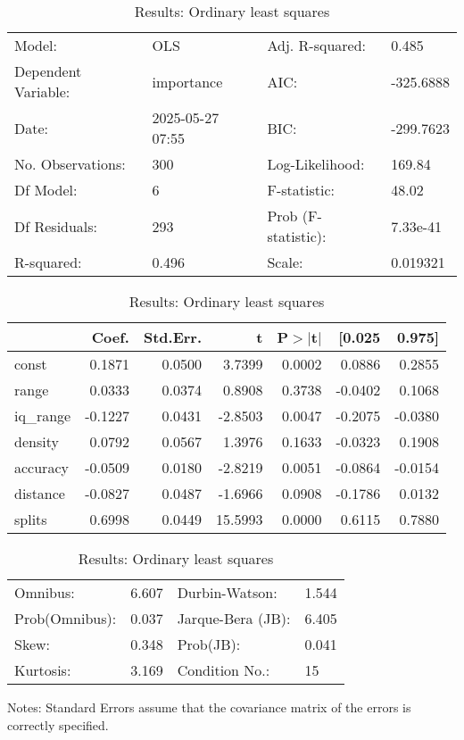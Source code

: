 \begin{table}
\caption{Results: Ordinary least squares}
\label{}
\begin{center}
\begin{tabular}{llll}
\hline
Model:              & OLS              & Adj. R-squared:     & 0.485      \\
Dependent Variable: & importance       & AIC:                & -325.6888  \\
Date:               & 2025-05-27 07:55 & BIC:                & -299.7623  \\
No. Observations:   & 300              & Log-Likelihood:     & 169.84     \\
Df Model:           & 6                & F-statistic:        & 48.02      \\
Df Residuals:       & 293              & Prob (F-statistic): & 7.33e-41   \\
R-squared:          & 0.496            & Scale:              & 0.019321   \\
\hline
\end{tabular}
\end{center}

\begin{center}
\begin{tabular}{lrrrrrr}
\hline
          &   Coef. & Std.Err. &       t & P$> |$t$|$ &  [0.025 &  0.975]  \\
\hline
const     &  0.1871 &   0.0500 &  3.7399 &      0.0002 &  0.0886 &  0.2855  \\
range     &  0.0333 &   0.0374 &  0.8908 &      0.3738 & -0.0402 &  0.1068  \\
iq\_range & -0.1227 &   0.0431 & -2.8503 &      0.0047 & -0.2075 & -0.0380  \\
density   &  0.0792 &   0.0567 &  1.3976 &      0.1633 & -0.0323 &  0.1908  \\
accuracy  & -0.0509 &   0.0180 & -2.8219 &      0.0051 & -0.0864 & -0.0154  \\
distance  & -0.0827 &   0.0487 & -1.6966 &      0.0908 & -0.1786 &  0.0132  \\
splits    &  0.6998 &   0.0449 & 15.5993 &      0.0000 &  0.6115 &  0.7880  \\
\hline
\end{tabular}
\end{center}

\begin{center}
\begin{tabular}{llll}
\hline
Omnibus:       & 6.607 & Durbin-Watson:    & 1.544  \\
Prob(Omnibus): & 0.037 & Jarque-Bera (JB): & 6.405  \\
Skew:          & 0.348 & Prob(JB):         & 0.041  \\
Kurtosis:      & 3.169 & Condition No.:    & 15     \\
\hline
\end{tabular}
\end{center}
\end{table}
\bigskip
Notes: \newline 
[1] Standard Errors assume that the covariance matrix of the errors is correctly specified.